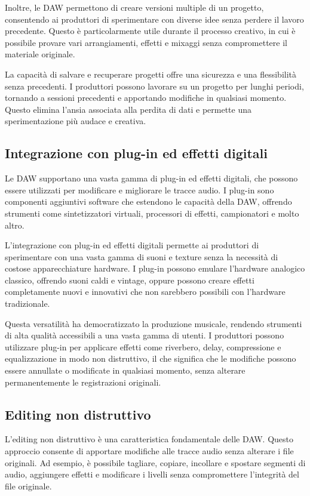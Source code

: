 \documentclass{book}
\begin{document}
Inoltre, le DAW permettono di creare versioni multiple di un progetto, consentendo ai produttori di sperimentare con diverse idee senza perdere il lavoro precedente. Questo è particolarmente utile durante il processo creativo, in cui è possibile provare vari arrangiamenti, effetti e mixaggi senza compromettere il materiale originale.

La capacità di salvare e recuperare progetti offre una sicurezza e una flessibilità senza precedenti. I produttori possono lavorare su un progetto per lunghi periodi, tornando a sessioni precedenti e apportando modifiche in qualsiasi momento. Questo elimina l’ansia associata alla perdita di dati e permette una sperimentazione più audace e creativa.

\subsection{Integrazione con plug-in ed effetti digitali}

Le DAW supportano una vasta gamma di plug-in ed effetti digitali, che possono essere utilizzati per modificare e migliorare le tracce audio. I plug-in sono componenti aggiuntivi software che estendono le capacità della DAW, offrendo strumenti come sintetizzatori virtuali, processori di effetti, campionatori e molto altro.

L’integrazione con plug-in ed effetti digitali permette ai produttori di sperimentare con una vasta gamma di suoni e texture senza la necessità di costose apparecchiature hardware. I plug-in possono emulare l’hardware analogico classico, offrendo suoni caldi e vintage, oppure possono creare effetti completamente nuovi e innovativi che non sarebbero possibili con l’hardware tradizionale.

Questa versatilità ha democratizzato la produzione musicale, rendendo strumenti di alta qualità accessibili a una vasta gamma di utenti. I produttori possono utilizzare plug-in per applicare effetti come riverbero, delay, compressione e equalizzazione in modo non distruttivo, il che significa che le modifiche possono essere annullate o modificate in qualsiasi momento, senza alterare permanentemente le registrazioni originali.

\subsection{Editing non distruttivo}

L’editing non distruttivo è una caratteristica fondamentale delle DAW. Questo approccio consente di apportare modifiche alle tracce audio senza alterare i file originali. Ad esempio, è possibile tagliare, copiare, incollare e spostare segmenti di audio, aggiungere effetti e modificare i livelli senza compromettere l’integrità del file originale.
\end{document}
